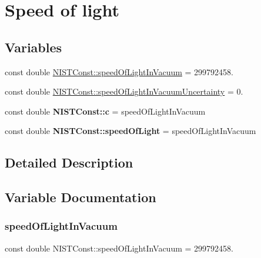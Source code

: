 \hypertarget{group___speed_of_light}{}\section{Speed of light}
\label{group___speed_of_light}
\subsection*{Variables}
\begin{DoxyCompactItemize}
\item 
const double \hyperlink{group___speed_of_light_gacb4a04d9cca33259effabdd28c28e964}{N\+I\+S\+T\+Const\+::speed\+Of\+Light\+In\+Vacuum} = 299792458.
\item 
const double \hyperlink{group___speed_of_light_gafb67b7afe777d6e23a70ae69e83542d1}{N\+I\+S\+T\+Const\+::speed\+Of\+Light\+In\+Vacuum\+Uncertainty} = 0.
\item 
\mbox{\label{group___speed_of_light_ga2bd39b3a464ca74134be618ed1cf1798}} 
const double {\bfseries N\+I\+S\+T\+Const\+::c} = speed\+Of\+Light\+In\+Vacuum
\item 
\mbox{\label{group___speed_of_light_ga0be1be2f994cccb0cc27bac50f6dd7a3}} 
const double {\bfseries N\+I\+S\+T\+Const\+::speed\+Of\+Light} = speed\+Of\+Light\+In\+Vacuum
\end{DoxyCompactItemize}


\subsection{Detailed Description}


\subsection{Variable Documentation}
\mbox{\label{group___speed_of_light_gacb4a04d9cca33259effabdd28c28e964}} 
\subsubsection{\texorpdfstring{speed\+Of\+Light\+In\+Vacuum}{speedOfLightInVacuum}}
{\footnotesize\ttfamily const double N\+I\+S\+T\+Const\+::speed\+Of\+Light\+In\+Vacuum = 299792458.}


